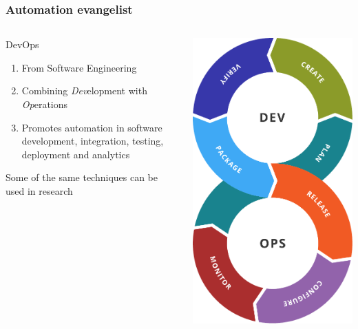 \documentclass[handout, notes=hide]{beamer}
\begin{document}
\begin{frame}
\frametitle{Automation evangelist}
\setlength{\parskip}{0.5em}

\begin{columns}[T]
\begin{column}[T]{0.7\textwidth}
\setlength{\parskip}{0.7em}
DevOps
\begin{enumerate}
\item From Software Engineering
\item Combining {\it Dev\/}elopment with {\it Op\/}erations
\item Promotes automation in software development, integration, testing, deployment and analytics
\end{enumerate}

Some of the same techniques can be used in research

\end{column}
\begin{column}[T]{0.3\textwidth}
\vspace{0.0em}
\includegraphics[width=1.0\textwidth]{devops}
\end{column}
\end{columns}



\end{frame}
\end{document}
